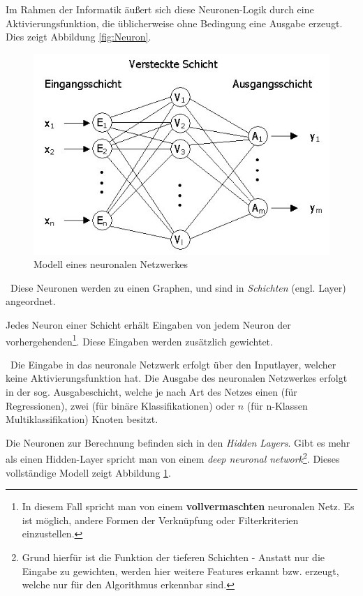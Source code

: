 Im Rahmen der Informatik äußert sich diese Neuronen-Logik durch eine Aktivierungsfunktion, die üblicherweise ohne Bedingung eine Ausgabe erzeugt. Dies zeigt Abbildung \ref{fig:Neuron}.
\begin{figure}[h]
\begin{center}
	\includegraphics[width=0.9\linewidth]{Bilder/petry19}
	\caption[Modell eines neuronalen Netzwerkes: \url{
		http://www.jurpc.de/jurpc/show?id=19990187}]{Modell eines neuronalen Netzwerkes}
	\label{fig:NN-Modell}
\end{center}
\end{figure}
~\newline Diese Neuronen werden zu einen Graphen, und sind in \textit{Schichten} (engl. Layer) angeordnet. 

Jedes Neuron einer Schicht erhält Eingaben von jedem Neuron der vorhergehenden\footnote{In diesem Fall spricht man von einem \textbf{vollvermaschten} neuronalen Netz. Es ist möglich, andere Formen der Verknüpfung oder Filterkriterien einzustellen.}. Diese Eingaben werden zusätzlich gewichtet. 

~\newline Die Eingabe in das neuronale Netzwerk erfolgt über den Inputlayer, welcher keine Aktivierungsfunktion hat. Die Ausgabe des neuronalen Netzwerkes erfolgt in der sog. Ausgabeschicht, welche je nach Art des Netzes einen (für Regressionen), zwei (für binäre Klassifikationen) oder $n$ (für n-Klassen Multiklassifikation) Knoten besitzt.

Die Neuronen zur Berechnung befinden sich in den \textit{Hidden Layers}. Gibt es mehr als einen Hidden-Layer spricht man von einem \textit{deep neuronal network}\footnote{Grund hierfür ist die Funktion der tieferen Schichten - Anstatt nur die Eingabe zu gewichten, werden hier weitere Features erkannt bzw. erzeugt, welche nur für den Algorithmus erkennbar sind.}. Dieses vollständige Modell zeigt Abbildung \ref{fig:NN-Modell}.

